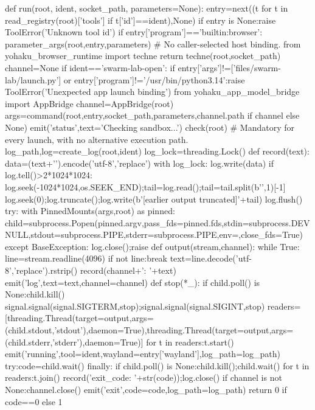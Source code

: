 def run(root, ident, socket_path, parameters=None):
    entry=next((t for t in read_registry(root)['tools'] if t['id']==ident),None)
    if entry is None:raise ToolError('Unknown tool id')
    if entry['program']=='builtin:browser':
        parameter_args(root,entry,parameters)  # No caller-selected host binding.
        from yohaku_browser_runtime import techne
        return techne(root,socket_path)
    channel=None
    if ident=='swarm-lab-open':
        if entry['args']!=['files/swarm-lab/launch.py'] or entry['program']!='/usr/bin/python3.14':raise ToolError('Unexpected app launch binding')
        from yohaku_app_model_bridge import AppBridge
        channel=AppBridge(root)
    args=command(root,entry,socket_path,parameters,channel.path if channel else None)
    emit('status',text='Checking sandbox...')
    check(root) # Mandatory for every launch, with no alternative execution path.
    log_path,log=create_log(root,ident)
    log_lock=threading.Lock()
    def record(text):
        data=(text+'\n').encode('utf-8','replace')
        with log_lock:
            log.write(data)
            if log.tell()>2*1024*1024:
                log.seek(-1024*1024,os.SEEK_END);tail=log.read();tail=tail.split(b'\n',1)[-1]
                log.seek(0);log.truncate();log.write(b'[earlier output truncated]\n'+tail)
            log.flush()
    try:
        with PinnedMounts(args,root) as pinned:
            child=subprocess.Popen(pinned.argv,pass_fds=pinned.fds,stdin=subprocess.DEVNULL,stdout=subprocess.PIPE,stderr=subprocess.PIPE,env={},close_fds=True)
    except BaseException:
        log.close();raise
    def output(stream,channel):
        while True:
            line=stream.readline(4096)
            if not line:break
            text=line.decode('utf-8','replace').rstrip()
            record(channel+': '+text)
            emit('log',text=text,channel=channel)
    def stop(*_):
        if child.poll() is None:child.kill()
    signal.signal(signal.SIGTERM,stop);signal.signal(signal.SIGINT,stop)
    readers=[threading.Thread(target=output,args=(child.stdout,'stdout'),daemon=True),threading.Thread(target=output,args=(child.stderr,'stderr'),daemon=True)]
    for t in readers:t.start()
    emit('running',tool=ident,wayland=entry['wayland'],log_path=log_path)
    try:code=child.wait()
    finally:
        if child.poll() is None:child.kill();child.wait()
    for t in readers:t.join()
    record('exit_code: '+str(code));log.close()
    if channel is not None:channel.close()
    emit('exit',code=code,log_path=log_path)
    return 0 if code==0 else 1

